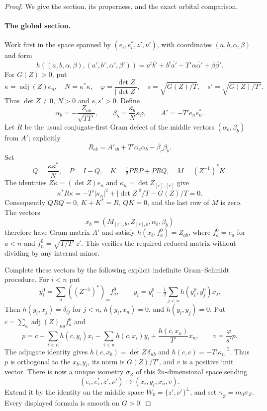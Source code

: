 \begin{proof}
We give the section, its properness, and the exact orbital comparison.

\paragraph{The global section.}
Work first in the space spanned by
$(e_i,e_i^*,z',\nu')$, with coordinates $(a,b,\alpha,\beta)$ and
form
\[
 h((a,b,\alpha,\beta),(a',b',\alpha',\beta'))
 =a^t\overline{b'}+b^t\overline{a'}
       -T'\alpha\overline{\alpha'}+\beta\overline{\beta'}.
\]
For $G(Z)>0$, put
\[
 \kappa=\operatorname{adj}(Z)e_n,\quad N=\kappa^*\kappa,
 \quad\varphi=\frac{\det Z}{|\det Z|},\quad
 s=\sqrt{G(Z)/T},\quad s'=\sqrt{G(Z)/T'}.
\]
Thus $\det Z\ne0$, $N>0$ and $s,s'>0$.  Define
\[
 \alpha_b=-\frac{Z_{nb}}{\sqrt{TT'}},\qquad
 \beta_b=\frac{\overline{\kappa_b}}N s\varphi,
 \qquad A'=-T'e_ne_n^*.
\]
Let $R$ be the usual conjugate-first Gram defect of the middle
vectors $(\alpha_b,\beta_b)$ from $A'$; explicitly
\[
 R_{cb}=A'_{cb}
       +T'\overline{\alpha_c}\alpha_b
       -\overline{\beta_c}\beta_b.
\]
Set
\[
 Q=\frac{\kappa\kappa^*}{N},\quad P=I-Q,\quad
 K=\tfrac12PRP+PRQ,\quad M=(Z^{-1})^*K.
\]
The identities $Z\kappa=(\det Z)e_n$ and
$\kappa_n=\det Z_{[r],[r]}$ give
\[
 \kappa^*R\kappa
   =-T'|\kappa_n|^2+|\det Z|^2/T-G(Z)/T=0.
\]
Consequently $QRQ=0$, $K+K^*=R$, $QK=0$, and the last row of
$M$ is zero.  The vectors
\[
 x_b=(M_{[r],b},Z_{[r],b},\alpha_b,\beta_b)
\]
therefore have Gram matrix $A'$ and satisfy
$h(x_b,f_a^0)=Z_{ab}$, where
$f_a^0=e_a$ for $a<n$ and $f_n^0=\sqrt{T/T'}\,z'$.
This verifies the required reduced matrix without dividing by
any internal minor.

Complete these vectors by the following explicit indefinite
Gram--Schmidt procedure.  For $i<n$ put
\[
 y_i^0=\sum_a((Z^{-1})^*)_{ai}f_a^0,\qquad
 y_i=y_i^0-\tfrac12\sum_{j<n}h(y_i^0,y_j^0)x_j.
\]
Then $h(y_i,x_j)=\delta_{ij}$ for $j<n$,
$h(y_i,x_n)=0$, and $h(y_i,y_j)=0$.
Put $c=\sum_a\overline{\operatorname{adj}(Z)_{na}}f_a^0$ and
\[
 p=c-\sum_{i<n}h(c,y_i)x_i-\sum_{i<n}h(c,x_i)y_i
                       +\frac{h(c,x_n)}{T'}x_n,
 \qquad v=\frac{\varphi}{s'}p.
\]
The adjugate identity gives $h(c,x_b)=\overline{\det Z}\,
\delta_{nb}$ and $h(c,c)=-T|\kappa_n|^2$.  Thus $p$ is
orthogonal to the $x_b,y_i$, its norm is $G(Z)/T'$, and $v$ is
a positive unit vector.  There is now a unique isometry $\sigma_Z$
of this $2n$-dimensional space sending
\[
       (e_i,e_i^*,z',\nu')\longmapsto(x_i,y_i,x_n,v).
\]
Extend it by the identity on the middle space
$W_0=\{z',\nu'\}^{\perp}$, and set $\gamma_Z=m_0\sigma_Z$.
Every displayed formula is smooth on $G>0$.


\end{proof}
